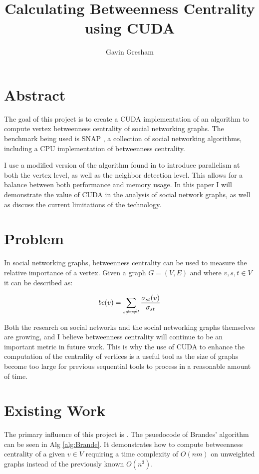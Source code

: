 \documentclass[10pt,twocolumn]{article}
\begin{document}
\title{Calculating Betweenness Centrality using CUDA}
\author{Gavin Gresham}
\maketitle

\section{Abstract}
The goal of this project is to create a CUDA \cite{cudaGuide} implementation of an algorithm to compute vertex betweenness centrality of social networking graphs. The benchmark being used is SNAP \cite{snapGraph}, a collection of social networking algorithms, including a CPU implementation of betweenness centrality. 
 
I use a modified version of the algorithm found in \cite{Brandes01afaster} to introduce parallelism at both the vertex level, as well as the neighbor detection level. This allows for a balance between both performance and memory usage. In this paper I will demonstrate the value of CUDA in the analysis of social network graphs, as well as discuss the current limitations of the technology.

\section{Problem}
In social networking graphs, betweenness centrality can be used to measure the relative importance of a vertex. Given a graph $G = (V, E)$  and where $v,s,t \in V$ it can be described as:

\begin{equation*}
bc(v) = \sum_{s \neq v \neq t}{\frac{\sigma_{st}(v)}{\sigma_{st}}}\\
\end{equation*}

Both the research on social networks and the social networking graphs themselves are growing, and I believe betweenness centrality will continue to be an important metric in future work. This is why the use of CUDA to enhance the computation of the centrality of vertices is a useful tool as the size of graphs become too large for previous sequential tools to process in a reasonable amount of time.

\section{Existing Work}
The primary influence of this project is \cite{Brandes01afaster}. The psuedocode of Brandes' algorithm can be seen in Alg \ref{alg:Brande}. It demonstrates how to compute betweenness centrality of a given $v \in V$  requiring a time complexity of $O(nm)$ on unweighted graphs instead of the previously known $O (n^3)$.
\end{document}
